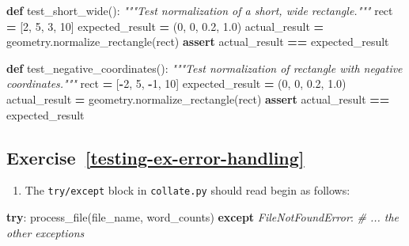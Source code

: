 \documentclass[
]{krantz}
\makeatletter
\newenvironment{Shaded}{\begin{snugshade}}{\end{snugshade}}
\newcommand{\CommentTok}[1]{\textcolor[rgb]{0.56,0.35,0.01}{\textit{#1}}}
\newcommand{\ControlFlowTok}[1]{\textcolor[rgb]{0.13,0.29,0.53}{\textbf{#1}}}
\newcommand{\DecValTok}[1]{\textcolor[rgb]{0.00,0.00,0.81}{#1}}
\newcommand{\FloatTok}[1]{\textcolor[rgb]{0.00,0.00,0.81}{#1}}
\newcommand{\KeywordTok}[1]{\textcolor[rgb]{0.13,0.29,0.53}{\textbf{#1}}}
\newcommand{\NormalTok}[1]{#1}
\newcommand{\OperatorTok}[1]{\textcolor[rgb]{0.81,0.36,0.00}{\textbf{#1}}}
\newcommand{\PreprocessorTok}[1]{\textcolor[rgb]{0.56,0.35,0.01}{\textit{#1}}}
\providecommand{\tightlist}{%
  \setlength{\itemsep}{0pt}\setlength{\parskip}{0pt}}
\newenvironment{kframe}{%
\medskip{}
\setlength{\fboxsep}{.8em}
 \def\at@end@of@kframe{}%
 \ifinner\ifhmode%
  \def\at@end@of@kframe{\end{minipage}}%
  \begin{minipage}{\columnwidth}%
 \fi\fi%
 \def\FrameCommand##1{\hskip\@totalleftmargin \hskip-\fboxsep
 \colorbox{shadecolor}{##1}\hskip-\fboxsep
     \hskip-\linewidth \hskip-\@totalleftmargin \hskip\columnwidth}%
 \MakeFramed {\advance\hsize-\width
   \@totalleftmargin\z@ \linewidth\hsize
   \@setminipage}}%
 {\par\unskip\endMakeFramed%
 \at@end@of@kframe}
\renewenvironment{Shaded}{\begin{kframe}}{\end{kframe}}
\makeatother
\begin{document}
\begin{Shaded}
\begin{Highlighting}[]
\KeywordTok{def}\NormalTok{ test\_short\_wide():}
    \CommentTok{"""Test normalization of a short, wide rectangle."""}
\NormalTok{    rect }\OperatorTok{=}\NormalTok{ [}\DecValTok{2}\NormalTok{, }\DecValTok{5}\NormalTok{, }\DecValTok{3}\NormalTok{, }\DecValTok{10}\NormalTok{]}
\NormalTok{    expected\_result }\OperatorTok{=}\NormalTok{ (}\DecValTok{0}\NormalTok{, }\DecValTok{0}\NormalTok{, }\FloatTok{0.2}\NormalTok{, }\FloatTok{1.0}\NormalTok{)}
\NormalTok{    actual\_result }\OperatorTok{=}\NormalTok{ geometry.normalize\_rectangle(rect)}
    \ControlFlowTok{assert}\NormalTok{ actual\_result }\OperatorTok{==}\NormalTok{ expected\_result}
    
\KeywordTok{def}\NormalTok{ test\_negative\_coordinates():}
    \CommentTok{"""Test normalization of rectangle with negative coordinates."""}
\NormalTok{    rect }\OperatorTok{=}\NormalTok{ [}\OperatorTok{{-}}\DecValTok{2}\NormalTok{, }\DecValTok{5}\NormalTok{, }\OperatorTok{{-}}\DecValTok{1}\NormalTok{, }\DecValTok{10}\NormalTok{]}
\NormalTok{    expected\_result }\OperatorTok{=}\NormalTok{ (}\DecValTok{0}\NormalTok{, }\DecValTok{0}\NormalTok{, }\FloatTok{0.2}\NormalTok{, }\FloatTok{1.0}\NormalTok{)}
\NormalTok{    actual\_result }\OperatorTok{=}\NormalTok{ geometry.normalize\_rectangle(rect)}
    \ControlFlowTok{assert}\NormalTok{ actual\_result }\OperatorTok{==}\NormalTok{ expected\_result}
\end{Highlighting}
\end{Shaded}

\hypertarget{exercise-reftesting-ex-error-handling}{%
\subsection*{Exercise~\ref{testing-ex-error-handling}}\label{exercise-reftesting-ex-error-handling}}


\begin{enumerate}
\def\labelenumi{\arabic{enumi}.}
\tightlist
\item
  The \texttt{try/except} block in \texttt{collate.py} should read begin as follows:
\end{enumerate}

\begin{Shaded}
\begin{Highlighting}[]
\ControlFlowTok{try}\NormalTok{:}
\NormalTok{    process\_file(file\_name, word\_counts)}
\ControlFlowTok{except} \PreprocessorTok{FileNotFoundError}\NormalTok{:}
\CommentTok{\# ... the other exceptions}
\end{Highlighting}
\end{Shaded}
\end{document}
